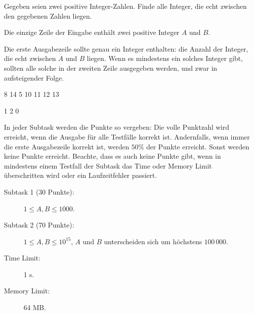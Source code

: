 \documentclass{boi2014-de}
\begin{document}
    Gegeben seien zwei positive Integer-Zahlen.  
    Finde alle Integer, die echt zwischen den gegebenen Zahlen liegen.

    \Input
    Die einzige Zeile der Eingabe enthält zwei positive Integer $A$ und $B$.

    \Output
    Die erste Ausgabezeile sollte genau ein Integer enthalten: 
    die Anzahl der Integer, die echt zwischen $A$ und $B$ liegen.
    Wenn es mindestens ein solches Integer gibt, sollten alle solche
    in der zweiten Zeile ausgegeben werden, und zwar in aufsteigender Folge.
    
    \Examples

    \simpleexample
    {
        8 14
    }
    {
        5  10 11 12 13
    }

    \simpleexample
    {
        1 2
    }
    {
        0
    }

    \Scoring

        In jeder Subtask werden die Punkte so vergeben:
        Die volle Punktzahl wird erreicht,
        wenn die Ausgabe für alle Testfälle korrekt ist.
        Andernfalls, wenn immer die erste Ausgabezeile korrekt ist, 
        werden $50\%$ der Punkte erreicht.  Sonst werden keine Punkte erreicht.
        Beachte, dass es auch keine Punkte gibt, wenn in mindestens einem
        Testfall der Subtask das Time oder Memory Limit überschritten wird 
        oder ein Laufzeitfehler passiert.

    \begin{description}

        \item[Subtask 1 (30 Punkte):] $1 \le A, B \le 1000$. 
        \item[Subtask 2 (70 Punkte):] $1 \le A, B \le 10^{15}$,
            $A$ und $B$ unterscheiden sich um höchstens $100\,000$.
    \end{description}

    \Constraints

    \begin{description}
        \item[Time Limit:] 1 s.
        \item[Memory Limit:] 64 MB.
    \end{description}
\end{document}
